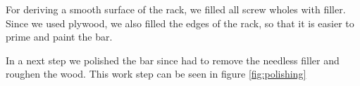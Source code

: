 \documentclass{acm_proc_article-sp}
\begin{document}
For deriving a smooth surface of the rack, we filled all screw wholes with filler. Since we used plywood, we also filled the edges of the rack, so that it is easier to prime and paint the bar. 

\begin{minipage}{\linewidth}%
\label{fig:polishing}%
\end{minipage}


In a next step we polished the bar since had to remove the needless filler and roughen the wood. This work step can be seen in figure \ref{fig:polishing}

\begin{minipage}{\linewidth}%
\label{fig:priming}%
\end{minipage}
 
\end{document}
